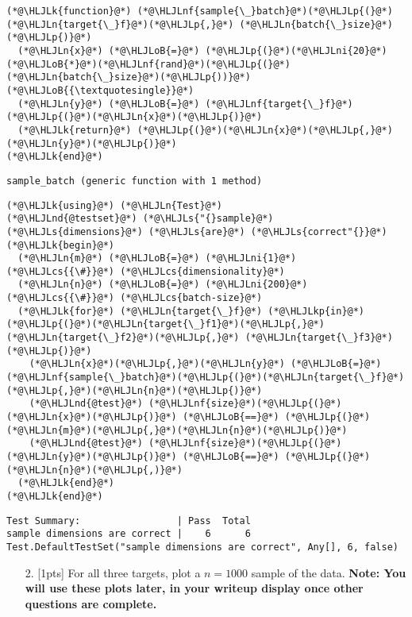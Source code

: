 \documentclass[12pt,a4paper]{article}
\newcommand{\HLJLk}[1]{\textcolor[RGB]{148,91,176}{\textbf{#1}}}
\newcommand{\HLJLkp}[1]{\textcolor[RGB]{148,91,176}{\textbf{#1}}}
\newcommand{\HLJLn}[1]{#1}
\newcommand{\HLJLnd}[1]{\textcolor[RGB]{214,102,97}{#1}}
\newcommand{\HLJLnf}[1]{\textcolor[RGB]{66,102,213}{#1}}
\newcommand{\HLJLs}[1]{\textcolor[RGB]{201,61,57}{#1}}
\newcommand{\HLJLni}[1]{\textcolor[RGB]{59,151,46}{#1}}
\newcommand{\HLJLoB}[1]{\textcolor[RGB]{102,102,102}{\textbf{#1}}}
\newcommand{\HLJLp}[1]{#1}
\newcommand{\HLJLcs}[1]{\textcolor[RGB]{153,153,119}{\textit{#1}}}
\begin{document}
\begin{lstlisting}
(*@\HLJLk{function}@*) (*@\HLJLnf{sample{\_}batch}@*)(*@\HLJLp{(}@*)(*@\HLJLn{target{\_}f}@*)(*@\HLJLp{,}@*) (*@\HLJLn{batch{\_}size}@*)(*@\HLJLp{)}@*)
  (*@\HLJLn{x}@*) (*@\HLJLoB{=}@*) (*@\HLJLp{(}@*)(*@\HLJLni{20}@*)(*@\HLJLoB{*}@*)(*@\HLJLnf{rand}@*)(*@\HLJLp{(}@*)(*@\HLJLn{batch{\_}size}@*)(*@\HLJLp{))}@*)(*@\HLJLoB{{\textquotesingle}}@*)
  (*@\HLJLn{y}@*) (*@\HLJLoB{=}@*) (*@\HLJLnf{target{\_}f}@*)(*@\HLJLp{(}@*)(*@\HLJLn{x}@*)(*@\HLJLp{)}@*)
  (*@\HLJLk{return}@*) (*@\HLJLp{(}@*)(*@\HLJLn{x}@*)(*@\HLJLp{,}@*)(*@\HLJLn{y}@*)(*@\HLJLp{)}@*)
(*@\HLJLk{end}@*)
\end{lstlisting}

\begin{lstlisting}
sample_batch (generic function with 1 method)
\end{lstlisting}


\begin{lstlisting}
(*@\HLJLk{using}@*) (*@\HLJLn{Test}@*)
(*@\HLJLnd{@testset}@*) (*@\HLJLs{"{}sample}@*) (*@\HLJLs{dimensions}@*) (*@\HLJLs{are}@*) (*@\HLJLs{correct"{}}@*) (*@\HLJLk{begin}@*)
  (*@\HLJLn{m}@*) (*@\HLJLoB{=}@*) (*@\HLJLni{1}@*) (*@\HLJLcs{{\#}}@*) (*@\HLJLcs{dimensionality}@*)
  (*@\HLJLn{n}@*) (*@\HLJLoB{=}@*) (*@\HLJLni{200}@*) (*@\HLJLcs{{\#}}@*) (*@\HLJLcs{batch-size}@*)
  (*@\HLJLk{for}@*) (*@\HLJLn{target{\_}f}@*) (*@\HLJLkp{in}@*) (*@\HLJLp{(}@*)(*@\HLJLn{target{\_}f1}@*)(*@\HLJLp{,}@*) (*@\HLJLn{target{\_}f2}@*)(*@\HLJLp{,}@*) (*@\HLJLn{target{\_}f3}@*)(*@\HLJLp{)}@*)
    (*@\HLJLn{x}@*)(*@\HLJLp{,}@*)(*@\HLJLn{y}@*) (*@\HLJLoB{=}@*) (*@\HLJLnf{sample{\_}batch}@*)(*@\HLJLp{(}@*)(*@\HLJLn{target{\_}f}@*)(*@\HLJLp{,}@*)(*@\HLJLn{n}@*)(*@\HLJLp{)}@*)
    (*@\HLJLnd{@test}@*) (*@\HLJLnf{size}@*)(*@\HLJLp{(}@*)(*@\HLJLn{x}@*)(*@\HLJLp{)}@*) (*@\HLJLoB{==}@*) (*@\HLJLp{(}@*)(*@\HLJLn{m}@*)(*@\HLJLp{,}@*)(*@\HLJLn{n}@*)(*@\HLJLp{)}@*)
    (*@\HLJLnd{@test}@*) (*@\HLJLnf{size}@*)(*@\HLJLp{(}@*)(*@\HLJLn{y}@*)(*@\HLJLp{)}@*) (*@\HLJLoB{==}@*) (*@\HLJLp{(}@*)(*@\HLJLn{n}@*)(*@\HLJLp{,)}@*)
  (*@\HLJLk{end}@*)
(*@\HLJLk{end}@*)
\end{lstlisting}

\begin{lstlisting}
Test Summary:                 | Pass  Total
sample dimensions are correct |    6      6
Test.DefaultTestSet("sample dimensions are correct", Any[], 6, false)
\end{lstlisting}


\begin{itemize}
\item[2. ] [1pts] For all three targets, plot a $n=1000$ sample of the data.  \textbf{Note: You will use these plots later, in your writeup display once other questions are complete.}

\end{itemize}
\end{document}
